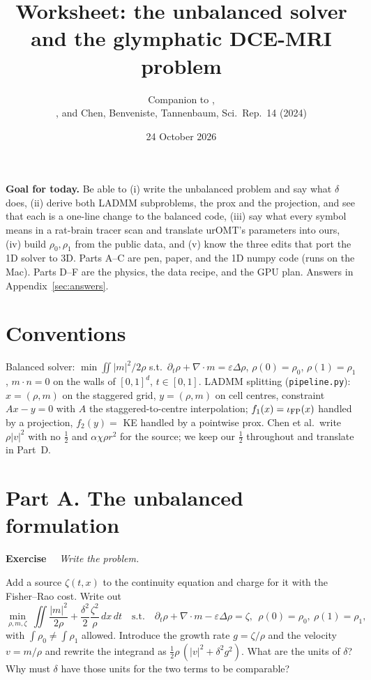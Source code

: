 \documentclass[11pt]{article}
\title{Worksheet: the unbalanced solver\\ and the glymphatic DCE-MRI problem}
\author{Companion to \code{python/optimal\_transport/*\_unbalanced.py},\\
\code{docs/unbalanced\_1d.md}, and Chen, Benveniste, Tannenbaum, Sci.\ Rep.\ 14 (2024)}
\date{24 October 2026}
\newcommand{\eps}{\varepsilon}
\newcommand{\code}[1]{\texttt{#1}}
\newcommand{\dv}{\nabla\cdot}
\newcounter{ex}
\newenvironment{ex}[1]{\refstepcounter{ex}\par\medskip\noindent\textbf{Exercise \theex}\ \ \textit{#1}\par\nopagebreak\smallskip}{\par\medskip}
\begin{document}
\maketitle

\begin{goal}
\textbf{Goal for today.} Be able to (i) write the unbalanced problem and say what $\delta$
does, (ii) derive both LADMM subproblems, the prox and the projection, and see that each is
a one-line change to the balanced code, (iii) say what every symbol means in a rat-brain
tracer scan and translate urOMT's parameters into ours, (iv) build $\rho_0,\rho_1$ from the
public data, and (v) know the three edits that port the 1D solver to 3D. Parts A--C are
pen, paper, and the 1D numpy code (runs on the Mac). Parts D--F are the physics, the data
recipe, and the GPU plan. Answers in Appendix~\ref{sec:answers}.
\end{goal}

\section*{Conventions}
Balanced solver: $\min\iint|m|^2/2\rho$ s.t.\ $\partial_t\rho+\dv m=\eps\Delta\rho$,
$\rho(0)=\rho_0$, $\rho(1)=\rho_1$, $m\cdot n=0$ on the walls of $[0,1]^d$, $t\in[0,1]$.
LADMM splitting (\code{pipeline.py}): $x=(\rho,m)$ on the staggered grid, $y=(\rho,m)$ on
cell centres, constraint $Ax-y=0$ with $A$ the staggered-to-centre interpolation;
$f_1(x)=\iota_{\rm FP}(x)$ handled by a projection, $f_2(y)=$ KE handled by a pointwise prox.
Chen et al.\ write $\rho|v|^2$ with no $\tfrac12$ and $\alpha\chi\rho r^2$ for the source;
we keep our $\tfrac12$ throughout and translate in Part~D.

\section*{Part A. The unbalanced formulation}

\begin{ex}{Write the problem.}
Add a source $\zeta(t,x)$ to the continuity equation and charge for it with the
Fisher--Rao cost. Write out
\[
  \min_{\rho,m,\zeta}\ \iint\frac{|m|^2}{2\rho}+\frac{\delta^2}{2}\frac{\zeta^2}{\rho}\,dx\,dt
  \quad\text{s.t.}\quad \partial_t\rho+\dv m-\eps\Delta\rho=\zeta,\ \ \rho(0)=\rho_0,\ \rho(1)=\rho_1,
\]
with $\int\rho_0\neq\int\rho_1$ allowed. Introduce the growth rate $g=\zeta/\rho$ and the
velocity $v=m/\rho$ and rewrite the integrand as $\tfrac12\rho\,(|v|^2+\delta^2g^2)$. What
are the units of $\delta$? Why must $\delta$ have those units for the two terms to be
comparable?
\end{ex}
\end{document}
